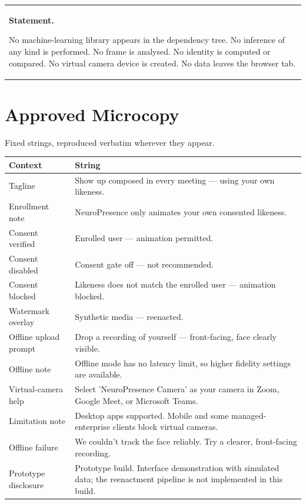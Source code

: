\documentclass[11pt,a4paper]{report}
\newenvironment{npnote}[1]
  {\par\medskip\noindent\begin{tabularx}{\linewidth}{|>{\hspace{4pt}}X<{\hspace{4pt}}|}
   \hline\rule{0pt}{3ex}\textbf{#1}\par\medskip}
  {\par\medskip\hline\end{tabularx}\par\medskip}
\begin{document}
\begin{npnote}{Statement.}
No machine-learning library appears in the dependency tree. No inference of any
kind is performed. No frame is analysed. No identity is computed or compared.
No virtual camera device is created. No data leaves the browser tab.
\end{npnote}

\appendix

\chapter{Approved Microcopy}

Fixed strings, reproduced verbatim wherever they appear.

\begin{longtable}{L{3.6cm} L{11.2cm}}
\toprule
\textbf{Context} & \textbf{String} \\
\midrule
\endhead
Tagline & Show up composed in every meeting --- using your own likeness. \\
Enrollment note & NeuroPresence only animates your own consented likeness. \\
Consent verified & Enrolled user --- animation permitted. \\
Consent disabled & Consent gate off --- not recommended. \\
Consent blocked & Likeness does not match the enrolled user --- animation
  blocked. \\
Watermark overlay & Synthetic media --- reenacted. \\
Offline upload prompt & Drop a recording of yourself --- front-facing, face
  clearly visible. \\
Offline note & Offline mode has no latency limit, so higher fidelity settings
  are available. \\
Virtual-camera help & Select 'NeuroPresence Camera' as your camera in Zoom,
  Google Meet, or Microsoft Teams. \\
Limitation note & Desktop apps supported. Mobile and some managed-enterprise
  clients block virtual cameras. \\
Offline failure & We couldn't track the face reliably. Try a clearer,
  front-facing recording. \\
Prototype disclosure & Prototype build. Interface demonstration with simulated
  data; the reenactment pipeline is not implemented in this build. \\
\bottomrule
\end{longtable}
\end{document}
